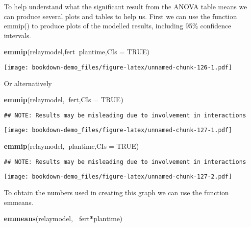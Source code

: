 \documentclass[]{book}
\newenvironment{Shaded}{\begin{snugshade}}{\end{snugshade}}
\newcommand{\KeywordTok}[1]{\textcolor[rgb]{0.13,0.29,0.53}{\textbf{#1}}}
\newcommand{\DataTypeTok}[1]{\textcolor[rgb]{0.13,0.29,0.53}{#1}}
\newcommand{\OtherTok}[1]{\textcolor[rgb]{0.56,0.35,0.01}{#1}}
\newcommand{\OperatorTok}[1]{\textcolor[rgb]{0.81,0.36,0.00}{\textbf{#1}}}
\newcommand{\NormalTok}[1]{#1}
\theoremstyle{definition}
\theoremstyle{definition}
\theoremstyle{definition}
\theoremstyle{remark}
\begin{document}
To help understand what the significant result from the ANOVA table
means we can produce several plots and tables to help us. First we can
use the function emmip() to produce plots of the modelled results,
including 95\% confidence intervals.

\begin{Shaded}
\begin{Highlighting}[]
\KeywordTok{emmip}\NormalTok{(relaymodel,fert}\OperatorTok{~}\NormalTok{plantime,}\DataTypeTok{CIs =} \OtherTok{TRUE}\NormalTok{)}
\end{Highlighting}
\end{Shaded}

\texttt{[image: bookdown-demo\_files/figure-latex/unnamed-chunk-126-1.pdf]}

Or alternatively

\begin{Shaded}
\begin{Highlighting}[]
\KeywordTok{emmip}\NormalTok{(relaymodel,}\OperatorTok{~}\NormalTok{fert,}\DataTypeTok{CIs =} \OtherTok{TRUE}\NormalTok{)}
\end{Highlighting}
\end{Shaded}

\begin{verbatim}
## NOTE: Results may be misleading due to involvement in interactions
\end{verbatim}

\texttt{[image: bookdown-demo\_files/figure-latex/unnamed-chunk-127-1.pdf]}

\begin{Shaded}
\begin{Highlighting}[]
\KeywordTok{emmip}\NormalTok{(relaymodel,}\OperatorTok{~}\NormalTok{plantime,}\DataTypeTok{CIs =} \OtherTok{TRUE}\NormalTok{)}
\end{Highlighting}
\end{Shaded}

\begin{verbatim}
## NOTE: Results may be misleading due to involvement in interactions
\end{verbatim}

\texttt{[image: bookdown-demo\_files/figure-latex/unnamed-chunk-127-2.pdf]}

To obtain the numbers used in creating this graph we can use the
function emmeans.

\begin{Shaded}
\begin{Highlighting}[]
\KeywordTok{emmeans}\NormalTok{(relaymodel, }\OperatorTok{~}\NormalTok{fert}\OperatorTok{*}\NormalTok{plantime)}
\end{Highlighting}
\end{Shaded}
\end{document}
